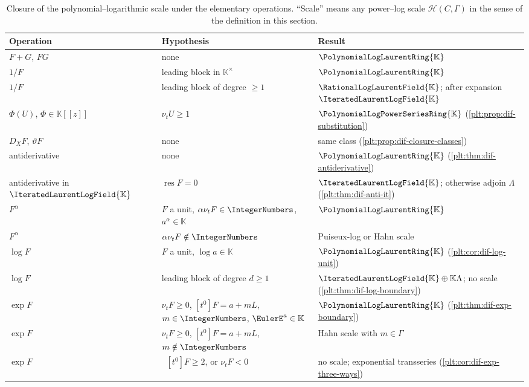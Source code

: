 \documentclass[11pt,oneside]{article}
\theoremstyle{plain}
\theoremstyle{definition}
\theoremstyle{remark}
\newcommand{\K}{\mathbb{K}}
\newcommand{\PLpow}{\PolynomialLogPowerSeriesRing{\K}}   %
\newcommand{\PLlau}{\PolynomialLogLaurentRing{\K}}       %
\newcommand{\PLrat}{\RationalLogLaurentField{\K}}        %
\newcommand{\PLit}{\IteratedLaurentLogField{\K}}         %
\newcommand{\ordt}{\nu_{t}}                              %
\DeclareMathOperator{\degL}{deg_{L}}
\newcommand{\DX}{D_{X}}                                  %
\newcommand{\EulerOp}{\vartheta}                         %
\begin{document}
\begin{table}[htbp]
\centering
\caption{Closure of the polynomial--logarithmic scale under the elementary
operations.  ``Scale'' means any power--log scale \(\mathcal H(C,\Gamma)\) in
the sense of the definition in this section.}
\label{plt:tab:dif-closure}
\small
\begin{tabular}{@{}p{}p{}p{}@{}}
\toprule
Operation & Hypothesis & Result \\
\midrule
\(F+G\), \(FG\) & none & \(\PLlau\) \\
\(1/F\) & leading block in \(\K^{\times}\) & \(\PLlau\) \\
\(1/F\) & leading block of degree \(\ge1\) & \(\PLrat\); after expansion
  \(\PLit\) \\
\(\Phi(U)\), \(\Phi\in\K[[z]]\) & \(\ordt U\ge1\) & \(\PLpow\)
  (\cref{plt:prop:dif-substitution}) \\
\(\DX F\), \(\EulerOp F\) & none & same class
  (\cref{plt:prop:dif-closure-classes}) \\
antiderivative & none & \(\PLlau\) (\cref{plt:thm:dif-antiderivative}) \\
antiderivative in \(\PLit\) & \(\operatorname{res}F=0\) & \(\PLit\); otherwise
  adjoin \(\Lambda\) (\cref{plt:thm:dif-anti-it}) \\
\(F^{\alpha}\) & \(F\) a unit, \(\alpha\ordt F\in\IntegerNumbers\),
  \(a^{\alpha}\in\K\) & \(\PLlau\) \\
\(F^{\alpha}\) & \(\alpha\ordt F\notin\IntegerNumbers\) & Puiseux-log or Hahn
  scale \\
\(\log F\) & \(F\) a unit, \(\log a\in\K\) & \(\PLlau\)
  (\cref{plt:cor:dif-log-unit}) \\
\(\log F\) & leading block of degree \(d\ge1\) & \(\PLit\oplus\K\Lambda\);
  no scale (\cref{plt:thm:dif-log-boundary}) \\
\(\exp F\) & \(\ordt F\ge0\), \([t^{0}]F=a+mL\), \(m\in\IntegerNumbers\),
  \(\EulerE^{a}\in\K\) & \(\PLlau\)
  (\cref{plt:thm:dif-exp-boundary}) \\
\(\exp F\) & \(\ordt F\ge0\), \([t^{0}]F=a+mL\), \(m\notin\IntegerNumbers\)
  & Hahn scale with \(m\in\Gamma\) \\
\(\exp F\) & \(\degL[t^{0}]F\ge2\), or \(\ordt F<0\) & no scale; exponential
  transseries (\cref{plt:cor:dif-exp-three-ways}) \\
\bottomrule
\end{tabular}
\end{table}
\end{document}

